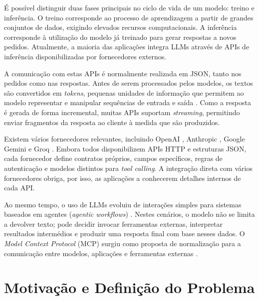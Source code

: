 \documentclass[11pt,a4paper]{report}
\begin{document}
    É possível distinguir duas fases principais no ciclo de vida de um modelo: treino e inferência. O treino corresponde ao processo de aprendizagem a partir de grandes conjuntos de dados, exigindo elevados recursos computacionais. A inferência corresponde à utilização do modelo já treinado para gerar respostas a novos pedidos. Atualmente, a maioria das aplicações integra LLMs através de APIs de inferência disponibilizadas por fornecedores externos.

    A comunicação com estas APIs é normalmente realizada em JSON, tanto nos pedidos como nas respostas. Antes de serem processados pelos modelos, os textos são convertidos em \textit{tokens}, pequenas unidades de informação que permitem ao modelo representar e manipular sequências de entrada e saída \cite{nvidia_tokens}. Como a resposta é gerada de forma incremental, muitas APIs suportam \textit{streaming}, permitindo enviar fragmentos da resposta ao cliente à medida que são produzidos.

    Existem vários fornecedores relevantes, incluindo OpenAI \cite{openai_api}, Anthropic \cite{anthropic_api}, Google Gemini \cite{google_gemini_api} e Groq \cite{groq_api}. Embora todos disponibilizem APIs HTTP e estruturas JSON, cada fornecedor define contratos próprios, campos específicos, regras de autenticação e modelos distintos para \textit{tool calling}. A integração direta com vários fornecedores obriga, por isso, as aplicações a conhecerem detalhes internos de cada API.

    Ao mesmo tempo, o uso de LLMs evoluiu de interações simples para sistemas baseados em agentes (\textit{agentic workflows}) \cite{ibm_agentic_workflows}. Nestes cenários, o modelo não se limita a devolver texto; pode decidir invocar ferramentas externas, interpretar resultados intermédios e produzir uma resposta final com base nesses dados. O \textit{Model Context Protocol} (MCP) surgiu como proposta de normalização para a comunicação entre modelos, aplicações e ferramentas externas \cite{mcp_protocol}.

    \section{Motivação e Definição do Problema}
\end{document}
